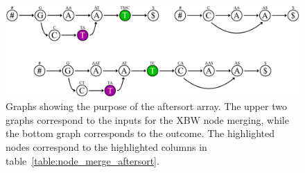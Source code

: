\documentclass[a4paper,12pt,twoside,BCOR=10mm]{scrbook}
\begin{document}
\begin{figure}[!htb]
\centering
\includegraphics[width=\textwidth]{evo_fig_node_merge_aftersort.pdf}
\caption[Graphs showing purpose of aftersort array]{Graphs showing the purpose of the aftersort array. The upper two graphs correspond to the inputs for the XBW node merging, while the bottom graph corresponds to the outcome. The highlighted nodes correspond to the highlighted columns in table~\ref{table:node_merge_aftersort}.} \label{fig:evo_fig_node_merge_aftersort}
\end{figure}
\end{document}
